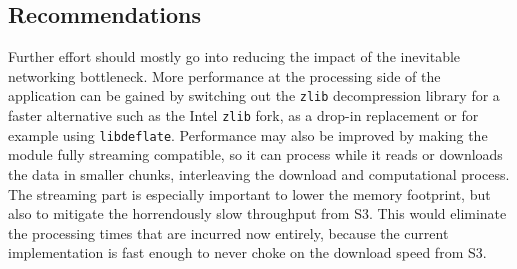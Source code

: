 \documentclass{article}
\begin{document}
\subsection{Recommendations}
Further effort should mostly go into reducing the impact of the inevitable networking bottleneck. More performance at the processing side of the application can be gained by switching out the \texttt{zlib} decompression library for a faster alternative such as the Intel \texttt{zlib} fork, as a drop-in replacement or for example using \texttt{libdeflate}.
Performance may also be improved by making the module fully streaming compatible, so it can process while it reads or downloads the data in smaller chunks, interleaving the download and computational process.
The streaming part is especially important to lower the memory footprint, but also to mitigate the horrendously slow throughput from S3.
This would eliminate the processing times that are incurred now entirely, because the current implementation is fast enough to never choke on the download speed from S3.


\printbibliography
\end{document}
